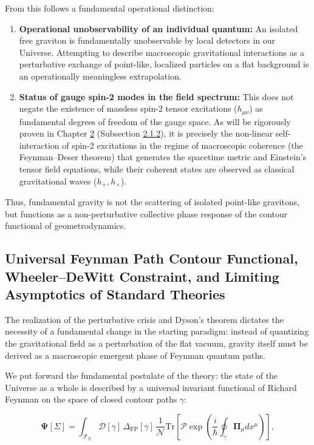 From this follows a fundamental operational distinction:
\begin{enumerate}
\item \textbf{Operational unobservability of an individual quantum:} An isolated free graviton is fundamentally unobservable by local detectors in our Universe. Attempting to describe macroscopic gravitational interactions as a perturbative exchange of point-like, localized particles on a flat background is an operationally meaningless extrapolation.
\item \textbf{Status of gauge spin-2 modes in the field spectrum:} This does not negate the existence of massless spin-2 tensor excitations ($h_{\mu\nu}$) as fundamental degrees of freedom of the gauge space. As will be rigorously proven in Chapter \hyperref[sec:rozdil2]{2} (Subsection \hyperref[sec:2.1.2]{2.1.2}), it is precisely the non-linear self-interaction of spin-2 excitations in the regime of macroscopic coherence (the Feynman--Deser theorem) that generates the spacetime metric and Einstein's tensor field equations, while their coherent states are observed as classical gravitational waves ($h_+, h_\times$).
\end{enumerate}

Thus, fundamental gravity is not the scattering of isolated point-like gravitons, but functions as a non-perturbative collective phase response of the contour functional of geometrodynamics.


\subsection{Universal Feynman Path Contour Functional, Wheeler--DeWitt Constraint, and Limiting Asymptotics of Standard Theories}\label{sec:1.2}

The realization of the perturbative crisis and Dyson's theorem dictates the necessity of a fundamental change in the starting paradigm: instead of quantizing the gravitational field as a perturbation of the flat vacuum, gravity itself must be derived as a macroscopic emergent phase of Feynman quantum paths.

We put forward the fundamental postulate of the theory: the state of the Universe as a whole is described by a universal invariant functional of Richard Feynman on the space of closed contour paths $\gamma$:

\begin{equation}\label{eq:1.26}\tag{1.26}
\mathbf{\Psi}[\Sigma] = \int_{\mathcal{F}_\Sigma} \mathcal{D}[\gamma] \, \Delta_{\text{FP}}[\gamma] \, \frac{1}{\mathcal{N}} \text{Tr}\left[ \mathcal{P}\exp\left( \frac{i}{\hbar} \oint_{\gamma} \mathbf{\Pi}_\mu dx^\mu \right) \right],
\end{equation}

